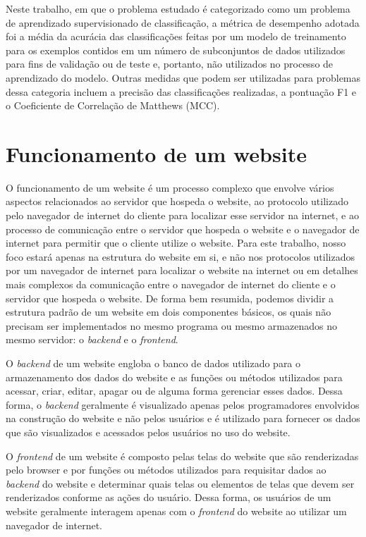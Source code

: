 Neste trabalho, em que o problema estudado é categorizado como um problema de aprendizado supervisionado de classificação, a métrica de desempenho adotada foi a média da acurácia das classificações feitas por um modelo de treinamento para os exemplos contidos em um número de subconjuntos de dados utilizados para fins de validação ou de teste e, portanto, não utilizados no processo de aprendizado do modelo. Outras medidas que podem ser utilizadas para problemas dessa categoria incluem a precisão das classificações realizadas, a pontuação F1 e o Coeficiente de Correlação de Matthews (MCC).

\section{Funcionamento de um website}

O funcionamento de um website é um processo complexo que envolve vários aspectos relacionados ao servidor que hospeda o website, ao protocolo utilizado pelo navegador de internet do cliente para localizar esse servidor na internet, e ao processo de comunicação entre o servidor que hospeda o website e o navegador de internet para permitir que o cliente utilize o website. Para este trabalho, nosso foco estará apenas na estrutura do website em si, e não nos protocolos utilizados por um navegador de internet para localizar o website na internet ou em detalhes mais complexos da comunicação entre o navegador de internet do cliente e o servidor que hospeda o website. De forma bem resumida, podemos dividir a estrutura padrão de um website em dois componentes básicos, os quais não precisam ser implementados no mesmo programa ou mesmo armazenados no mesmo servidor: o \textit{backend} e o \textit{frontend}.

O \textit{backend} de um website engloba o banco de dados utilizado para o armazenamento dos dados do website e as funções ou métodos utilizados para acessar, criar, editar, apagar ou de alguma forma gerenciar esses dados. Dessa forma, o \textit{backend} geralmente é visualizado apenas pelos programadores envolvidos na construção do website e não pelos usuários e é utilizado para fornecer os dados que são visualizados e acessados pelos usuários no uso do website.

O \textit{frontend} de um website é composto pelas telas do website que são renderizadas pelo browser e por funções ou métodos utilizados para requisitar dados ao \textit{backend} do website e determinar quais telas ou elementos de telas que devem ser renderizados conforme as ações do usuário. Dessa forma, os usuários de um website geralmente interagem apenas com o \textit{frontend} do website ao utilizar um navegador de internet.

